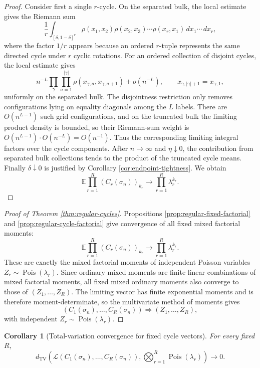 \documentclass[11pt]{article}
\newtheorem{corollary}[theorem]{Corollary}
\theoremstyle{remark}
\newcommand{\Ee}{\mathbb E}
\newcommand{\TV}{\mathrm{TV}}
\newcommand{\Pois}{\operatorname{Pois}}
\newcommand{\dd}{\,d}
\begin{document}
\begin{proof}
Consider first a single \(r\)-cycle.  On the separated bulk, the local estimate gives the Riemann sum
\[
        \frac1r
        \int_{[\delta,1-\delta]^r}
        \rho(x_1,x_2)\rho(x_2,x_3)\cdots\rho(x_r,x_1)
        \dd x_1\cdots\dd x_r,
\]
where the factor \(1/r\) appears because an ordered \(r\)-tuple represents the same directed cycle under \(r\) cyclic rotations.  For an ordered collection of disjoint cycles, the local estimate gives
\[
        n^{-L}\prod_{\gamma}\prod_{a=1}^{|\gamma|}
        \rho(x_{\gamma,a},x_{\gamma,a+1})+o(n^{-L}),
        \qquad x_{\gamma,|\gamma|+1}=x_{\gamma,1},
\]
uniformly on the separated bulk.  The disjointness restriction only removes configurations lying on equality diagonals among the \(L\) labels.  There are \(O(n^{L-1})\) such grid configurations, and on the truncated bulk the limiting product density is bounded, so their Riemann-sum weight is \(O(n^{L-1})\cdot O(n^{-L})=O(n^{-1})\).  Thus the corresponding limiting integral factors over the cycle components.  After \(n\to\infty\) and \(\eta\downarrow0\), the contribution from separated bulk collections tends to the product of the truncated cycle means.  Finally \(\delta\downarrow0\) is justified by Corollary \ref{cor:endpoint-tightness}.  We obtain
\[
        \Ee\prod_{r=1}^R(C_r(\sigma_n))_{k_r}
        \to \prod_{r=1}^R\lambda_r^{k_r}.
\]
\end{proof}

\begin{proof}[Proof of Theorem \ref{thm:regular-cycles}]
Propositions \ref{prop:regular-fixed-factorial} and
\ref{prop:regular-cycle-factorial} give convergence of all fixed mixed
factorial moments:
\[
        \Ee\prod_{r=1}^R(C_r(\sigma_n))_{k_r}
        \to
        \prod_{r=1}^R\lambda_r^{k_r}.
\]
These are exactly the mixed factorial moments of independent Poisson variables
\(Z_r\sim\Pois(\lambda_r)\).  Since ordinary mixed moments are finite linear
combinations of mixed factorial moments, all fixed mixed ordinary moments also
converge to those of \((Z_1,\ldots,Z_R)\).  The limiting vector has finite
exponential moments and is therefore moment-determinate, so the multivariate
method of moments gives
\[
        (C_1(\sigma_n),\ldots,C_R(\sigma_n))
        \Rightarrow (Z_1,\ldots,Z_R),
\]
with independent \(Z_r\sim\Pois(\lambda_r)\).
\end{proof}

\begin{corollary}[Total-variation convergence for fixed cycle vectors]\label{cor:regular-cycles-tv}
For every fixed $R$,
\[
 d_{\TV}\!\left(
 \mathcal L(C_1(\sigma_n),\ldots,C_R(\sigma_n)),
 \bigotimes_{r=1}^R\Pois(\lambda_r)
 \right)\longrightarrow0.
\]
\end{corollary}
\end{document}
